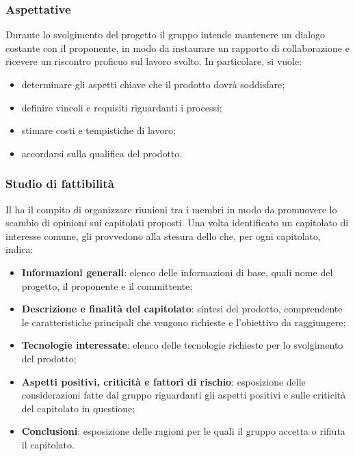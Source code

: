 \subsubsection{Aspettative}
Durante lo svolgimento del progetto il gruppo intende mantenere un dialogo costante con il proponente, in modo da instaurare un rapporto di collaborazione e ricevere un riscontro proficuo sul lavoro svolto. In particolare, si vuole:
\begin{itemize}
	\item determinare gli aspetti chiave che il prodotto dovrà soddisfare;
	\item definire vincoli e requisiti riguardanti i processi;
	\item stimare costi e tempistiche di lavoro;
	\item accordarsi sulla qualifica del prodotto.
\end{itemize}
\subsubsection{Studio di fattibilità}
Il \RdP{} ha il compito di organizzare riunioni tra i membri in modo da promuovere lo scambio di opinioni sui capitolati proposti. Una volta identificato un capitolato di interesse comune, gli \anas{} provvedono alla stesura dello \SdF{} che, per ogni capitolato, indica:
\begin{itemize}
	\item \textbf{Informazioni generali}: elenco delle informazioni di base, quali nome del progetto, il proponente e il committente;
	\item \textbf{Descrizione e finalità del capitolato}: sintesi del prodotto, comprendente le caratteristiche principali che vengono richieste e l'obiettivo da raggiungere;
	\item \textbf{Tecnologie interessate}: elenco delle tecnologie richieste per lo svolgimento del prodotto;
	\item \textbf{Aspetti positivi, criticità e fattori di rischio}: esposizione delle considerazioni fatte dal gruppo riguardanti gli aspetti positivi e sulle criticità del capitolato in questione;
	\item \textbf{Conclusioni}: esposizione delle ragioni per le quali il gruppo accetta o rifiuta il capitolato.
\end{itemize}
